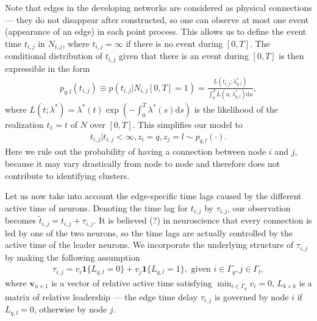 Note that edges in the developing networks are considered as physical connections --- they do not disappear after constructed, so
one can observe at most one event (appearance of an edge) in each point process.
This allows us to define the event time $t_{i,j}$ in $N_{i,j}$, where $t_{i,j}=\infty$ if there is no event during $[0,T]$.
The conditional distribution of $t_{i,j}$ given that there is an event during $[0,T]$ is then expressible in the form
\begin{align*}
p_{q,l}(t_{i,j}) \equiv p(t_{i,j}|N_{i,j}[0,T]=1) = \frac{L(t_{i,j};\lambda_{q,l}^*)}{\int_0^T L(u;\lambda_{q,l}^*) \text{d}u },
\end{align*}
where $L(t;\lambda^*)=\lambda^*(t) \exp \left( -\int_0^T \lambda^* (s) \text{d}s \right) $ is the likelihood of the realization $t_1=t$ of $N$ over $[0,T]$.
This simplifies our model to
\begin{align}
	t_{i,j}|t_{i,j}<\infty,z_i=q,z_j=l \sim p_{q,l}(\cdot).
\end{align}
Here we rule out the probability of having a connection between node $i$ and $j$, 
because it may vary drastically from node to node and therefore does not contribute to identifying clusters.

Let us now take into account the edge-specific time lags caused by the different active time of neurons.
Denoting the time lag for $t_{i,j}$ by $\tau_{i,j}$, our observation becomes
 $\tilde t_{i,j} = t_{i,j}+\tau_{i,j}$.
It is believed (?) in neuroscience that every connection is led by one of the two neurons, so the time lags are actually controlled by the active time of the leader neurons.
We incorporate the underlying structure of $\tau_{i,j}$ by making the following assumption
\begin{align}
\tau_{i,j} = v_i \mathbf{1}\{L_{q,l}=0\} + v_j \mathbf{1}\{L_{q,l}=1\}, \text{ given } i\in\Gamma_q, j\in\Gamma_l,
\label{eq: structure of tau}
\end{align}
where $\mathbf{v}_{n\times1}$ is a vector of relative active time satisfying $\min_{i\in\Gamma_q}v_i=0$, $L_{k\times k}$ is a matrix of relative leadership --- the edge time delay $\tau_{i,j}$ is governed by node $i$ if $L_{q,l}=0$, otherwise by node $j$.




